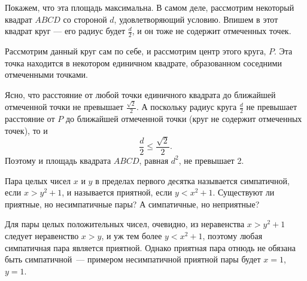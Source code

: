 \begin{itemize}
Покажем, что эта площадь максимальна.
В самом деле, рассмотрим некоторый квадрат $ABCD$ со стороной $d$, удовлетворяющий условию.
Впишем в этот квадрат круг --- его радиус будет $\frac{d}{2}$, и он тоже не содержит
отмеченных точек. 

\begin{center}\end{center}

Рассмотрим данный круг сам по себе, и рассмотрим центр этого 
круга, $P$. Эта точка находится в некотором
единичном квадрате, образованном соседними отмеченными точками.

\begin{center}\end{center}

Ясно, что расстояние от любой точки единичного квадрата до ближайшей отмеченной 
точки не превышает $\frac{\sqrt{2}}{2}$. А поскольку радиус круга $\frac{d}{2}$ не 
превышает расстояние от $P$ до ближайшей отмеченной точки (круг не содержит отмеченных точек), 
то и $$\frac{d}{2} \le \frac{\sqrt{2}}{2}.$$
Поэтому и площадь квадрата $ABCD$, равная $d^2$, не превышает 2.
\end{itemize}


\begin{itemize}
\itC Пара целых чисел $x$ и $y$ в пределах первого десятка называется симпатичной, если $x>y^2+1$, 
и называется  приятной, если $y<x^2+1$. Существуют ли приятные, но несимпатичные пары? 
А симпатичные, но неприятные?

\itr Для пары целых положительных чисел, очевидно, из неравенства
$x>y^2+1$ следует неравенство $x>y$, и уж тем более $y<x^2+1$,
поэтому любая симпатичная пара является приятной. Однако приятная пара отнюдь 
не обязана быть симпатичной~--- примером несимпатичной приятной пары будет
$x=1$, $y=1$.
\end{itemize}

